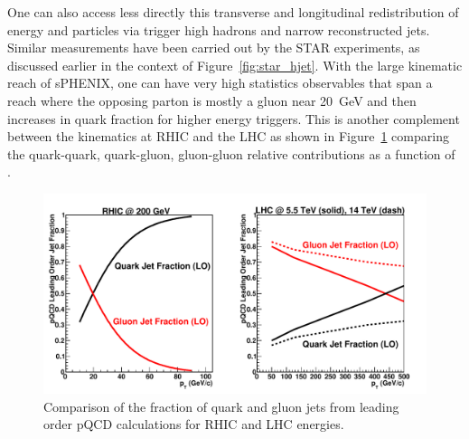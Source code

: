 
One can also access less directly this transverse and longitudinal redistribution of energy and particles
via trigger high \pt hadrons and narrow reconstructed jets.    Similar measurements have been carried out by
the STAR experiments, as discussed earlier in the context of Figure~\ref{fig:star_hjet}.   
With the large kinematic reach of sPHENIX, 
one can have very high statistics observables that span a reach where the opposing parton is mostly a gluon near 20~GeV and then
increases in quark fraction for higher energy triggers.   This is another complement between the kinematics at RHIC
and the LHC as shown in Figure~\ref{fig:partonfrac} comparing the quark-quark, quark-gluon, gluon-gluon relative contributions
as a function of \pt.

\begin{figure}[!hbt]
 \begin{center}
    \includegraphics[width=0.7\linewidth]{figs/figure_jetfraction_rhiclhc}
\caption{Comparison of the fraction of quark and gluon jets from leading order pQCD calculations for RHIC and LHC energies.
\label{fig:partonfrac}}
\end{center}
\end{figure}

